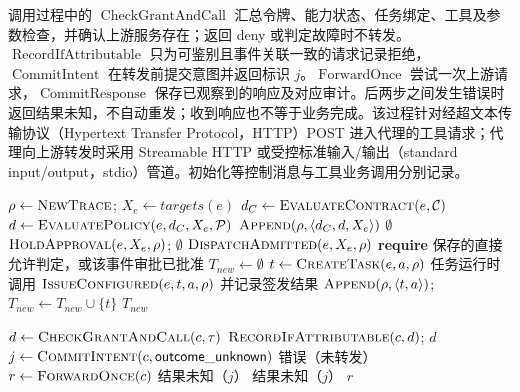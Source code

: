 调用过程中的 $\operatorname{CheckGrantAndCall}$ 汇总令牌、能力状态、任务绑定、工具及参数检查，并确认上游服务存在；返回 deny 或判定故障时不转发。$\operatorname{RecordIfAttributable}$ 只为可鉴别且事件关联一致的请求记录拒绝，$\operatorname{CommitIntent}$ 在转发前提交意图并返回标识 $j$。$\operatorname{ForwardOnce}$ 尝试一次上游请求，$\operatorname{CommitResponse}$ 保存已观察到的响应及对应审计。后两步之间发生错误时返回结果未知，不自动重发；收到响应也不等于业务完成。该过程针对经超文本传输协议（Hypertext Transfer Protocol，HTTP）POST 进入代理的工具请求；代理向上游转发时采用 Streamable HTTP 或受控标准输入/输出（standard input/output，stdio）管道。初始化等控制消息与工具业务调用分别记录。

\begin{algorithm}[!htb]
\caption{E2AG 事件准入与任务分发}\label{alg:e2ag-v11}
\begin{algorithmic}[1]
  \State $\rho\gets\Call{NewTrace}{}$; $X_e\gets targets(e)$
  \State $d_C\gets\Call{EvaluateContract}{e,\mathcal C}$
  \State $d\gets\Call{EvaluatePolicy}{e,d_C,X_e,\mathcal P}$
  \State $\Call{Append}{\rho,\langle d_C,d,X_e\rangle}$
   \State \Return $\emptyset$ \EndIf
    \State $\Call{HoldApproval}{e,X_e,\rho}$; \Return $\emptyset$
  \EndIf
  \State \Return $\Call{DispatchAdmitted}{e,X_e,\rho}$
\EndProcedure
{}
  \State \textbf{require} 保存的直接允许判定，或该事件审批已批准
  \State $T_{new}\gets\emptyset$
    \State $t\gets\Call{CreateTask}{e,a,\rho}$
    \State 任务运行时调用 $\Call{IssueConfigured}{e,t,a,\rho}$ 并记录签发结果
    \State $\Call{Append}{\rho,\langle t,a\rangle}$; $T_{new}\gets T_{new}\cup\{t\}$
  \EndFor
  \State \Return $T_{new}$
\EndProcedure
\end{algorithmic}
\end{algorithm}

\begin{algorithm}[!htb]
\caption{E2AG 调用检查与结果记录}\label{alg:e2ag-call-rr022}
\begin{algorithmic}[1]
  \State $d\gets\Call{CheckGrantAndCall}{c,\tau}$
    \State $\Call{RecordIfAttributable}{c,d}$; \Return $d$
  \EndIf
  \State $j\gets\Call{CommitIntent}{c,\mathsf{outcome\_unknown}}$
   \State \Return 错误（未转发） \EndIf
  \State $r\gets\Call{ForwardOnce}{c}$
   \State \Return 结果未知（$j$） \EndIf
    \State \Return 结果未知（$j$）
  \EndIf
  \State \Return $r$
\EndProcedure
\end{algorithmic}
\end{algorithm}

